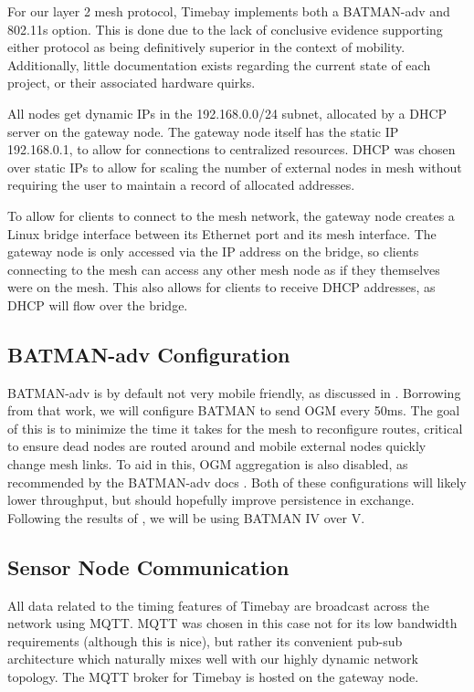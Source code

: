 \documentclass[journal]{IEEEtran}
\begin{document}
For our layer 2 mesh protocol, Timebay implements both a BATMAN-adv and 802.11s option. This is done due to the lack of conclusive evidence supporting either protocol as being definitively superior in the context of mobility. Additionally, little documentation exists regarding the current state of each project, or their associated hardware quirks.

All nodes get dynamic IPs in the 192.168.0.0/24 subnet, allocated by a DHCP server on the gateway node. The gateway node itself has the static IP 192.168.0.1, to allow for connections to centralized resources. DHCP was chosen over static IPs to allow for scaling the number of external nodes in mesh without requiring the user to maintain a record of allocated addresses.

To allow for clients to connect to the mesh network, the gateway node creates a Linux bridge interface between its Ethernet port and its mesh interface. The gateway node is only accessed via the IP address on the bridge, so clients connecting to the mesh can access any other mesh node as if they themselves were on the mesh. This also allows for clients to receive DHCP addresses, as DHCP will flow over the bridge. 

\subsection{BATMAN-adv Configuration}
BATMAN-adv is by default not very mobile friendly, as discussed in \cite{zeiger2009mobile}. Borrowing from that work, we will configure BATMAN to send OGM every 50ms. The goal of this is to minimize the time it takes for the mesh to reconfigure routes, critical to ensure dead nodes are routed around and mobile external nodes quickly change mesh links. To aid in this, OGM aggregation is also disabled, as recommended by the BATMAN-adv docs \cite{tweaking}. Both of these configurations will likely lower throughput, but should hopefully improve persistence in exchange. Following the results of \cite{8421863}, we will be using BATMAN IV over V.

\subsection{Sensor Node Communication}

All data related to the timing features of Timebay are broadcast across the network using MQTT. MQTT was chosen in this case not for its low bandwidth requirements (although this is nice), but rather its convenient pub-sub architecture which naturally mixes well with our highly dynamic network topology. The MQTT broker for Timebay is hosted on the gateway node.
\end{document}
